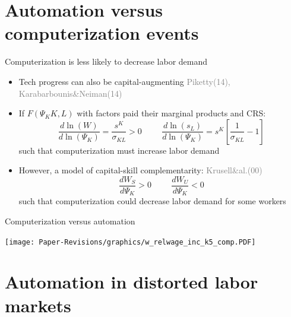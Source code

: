 \documentclass[aspectratio=169]{beamer}
\begin{document}
\section{Automation versus computerization events}

\begin{frame}{Computerization is less likely to decrease labor demand} \label{techspecinv}
\begin{itemize}
\item<1-> Tech progress can also be capital-augmenting \textcolor{gray}{\scriptsize{Piketty(14), Karabarbounis\&Neiman(14)}} \medskip
\item<2-> If $ F(\Psi_{K}K,L)$ with factors paid their marginal products and CRS:
\begin{equation} \nonumber
   \frac{ d \ln(W)}{d \ln(\Psi_{K})} = \frac{s^{K}}{\sigma_{KL}}  > 0 \hspace{1cm} \frac{ d \ln(s_{L})}{d \ln(\Psi_{K})} = s^{K} \left[ \frac{1}{\sigma_{KL}} -1 \right]
   \end{equation}
such that computerization must increase labor demand
\item<3-> However, a model of capital-skill complementarity: \textcolor{gray}{\scriptsize{Krusell\&al.(00)}}
\begin{equation} \nonumber
 \frac{ d W_{S}}{d \Psi_{K}} > 0 \hspace{1cm} \frac{ d W_{U}}{d \Psi_{K}} < 0 
\end{equation}
such that computerization could decrease labor demand for some workers
\end{itemize}
\end{frame}

\begin{frame}{Computerization versus automation \hyperlink{computersA}{}} \label{computers}
\noindent \begin{center}
	\texttt{[image: Paper-Revisions/graphics/w\_relwage\_inc\_k5\_comp.PDF]}
    \end{center}
\end{frame}

\section{Automation in distorted labor markets}
\end{document}
